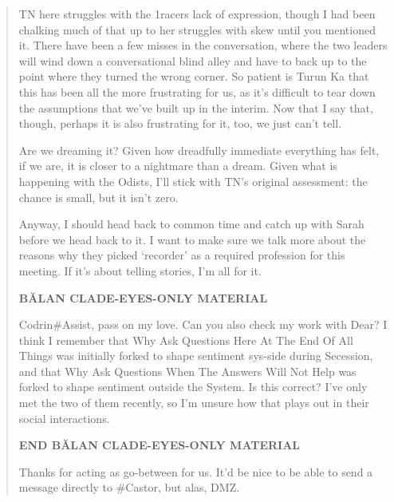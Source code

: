 \begin{quote}
TN here struggles with the 1racers lack of expression, though I had been chalking much of that up to her struggles with skew until you mentioned it. There have been a few misses in the conversation, where the two leaders will wind down a conversational blind alley and have to back up to the point where they turned the wrong corner. So patient is Turun Ka that this has been all the more frustrating for us, as it's difficult to tear down the assumptions that we've built up in the interim. Now that I say that, though, perhaps it is also frustrating for it, too, we just can't tell.

Are we dreaming it? Given how dreadfully immediate everything has felt, if we are, it is closer to a nightmare than a dream. Given what is happening with the Odists, I'll stick with TN's original assessment: the chance is small, but it isn't zero.

Anyway, I should head back to common time and catch up with Sarah before we head back to it. I want to make sure we talk more about the reasons why they picked `recorder' as a required profession for this meeting. If it's about telling stories, I'm all for it.

\begin{center}
\textbf{BĂLAN CLADE-EYES-ONLY MATERIAL}
\end{center}

Codrin\#Assist, pass on my love. Can you also check my work with Dear? I think I remember that Why Ask Questions Here At The End Of All Things was initially forked to shape sentiment sys-side during Secession, and that Why Ask Questions When The Answers Will Not Help was forked to shape sentiment outside the System. Is this correct? I've only met the two of them recently, so I'm unsure how that plays out in their social interactions.

\begin{center}
\textbf{END BĂLAN CLADE-EYES-ONLY MATERIAL}
\end{center}

Thanks for acting as go-between for us. It'd be nice to be able to send a message directly to \#Castor, but alas, DMZ.
\end{quote}
